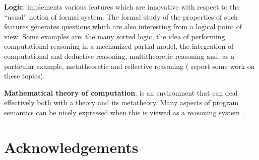 \vspace{0.2cm}
\noindent
{\bf Logic}.
{\GF} implements various features which are innovative with respect to the
``usual'' notion of formal system.
The formal study of the properties of such features generates questions which
are also interesting from a logical point of view.
Some examples are: the {\GF} many sorted logic, the idea of performing
computational reasoning in a mechanized partial model, the integration of
computational and deductive reasoning, multitheoretic reasoning and, as a
particular example, metatheoretic and reflective reasoning
(\cite{rww1,giunchiglia26,giunchiglia14,giunchiglia15,giunchiglia28} report some
work on these topics).

\vspace{0.2cm}
\noindent
{\bf Mathematical theory of computation}.
{\GF} is an environment that can deal effectively both with a theory and its
metatheory. 
Many aspects of program semantics can be nicely expressed when this is viewed as
a reasoning system~\cite{rww1}. 


\section{Acknowledgements}

